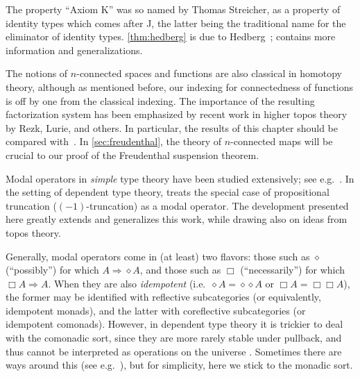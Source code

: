 The property ``Axiom K'' was so named by Thomas Streicher, as a property of identity types which comes after J, the latter being the traditional name for the eliminator of identity types.
\autoref{thm:hedberg} is due to Hedberg~\cite{hedberg1998coherence}; \cite{krausgeneralizations} contains more information and generalizations.

The notions of $n$-connected spaces and functions are also classical in homotopy theory, although as mentioned before, our indexing for connectedness of functions is off by one from the classical indexing.
The importance of the resulting factorization system has been emphasized by recent work in higher topos theory by Rezk, Lurie, and others.
In particular, the results of this chapter should be compared with~\cite[\S6.5.1]{lurie:higher-topoi}.
In \autoref{sec:freudenthal}, the theory of $n$-connected maps will be crucial to our proof of the Freudenthal suspension theorem.

Modal operators in \emph{simple} type theory have been studied extensively; see e.g.~\cite{modalTT}.  In the setting of dependent type theory, \cite{ab:bracket-types} treats the special case of propositional truncation ($(-1)$-truncation) as a modal operator.  The development presented here greatly extends and generalizes this work, while drawing also on ideas from topos theory.

Generally, modal operators come in (at least) two flavors: those such as $\diamond$ (``possibly'') for which $A\Rightarrow \diamond A$, and those such as $\Box$ (``necessarily'') for which $\Box A \Rightarrow A$.
When they are also \emph{idempotent} (i.e.\ $\diamond A = \diamond{\diamond A}$ or $\Box A = \Box{\Box A}$), the former may be identified with reflective subcategories (or equivalently, idempotent monads), and the latter with coreflective subcategories (or idempotent comonads).
However, in dependent type theory it is trickier to deal with the comonadic sort, since they are more rarely stable under pullback, and thus cannot be interpreted as operations on the universe \UU.
Sometimes there are ways around this (see e.g.~\cite{QGFTinCHoTT12}), but for simplicity, here we stick to the monadic sort.

